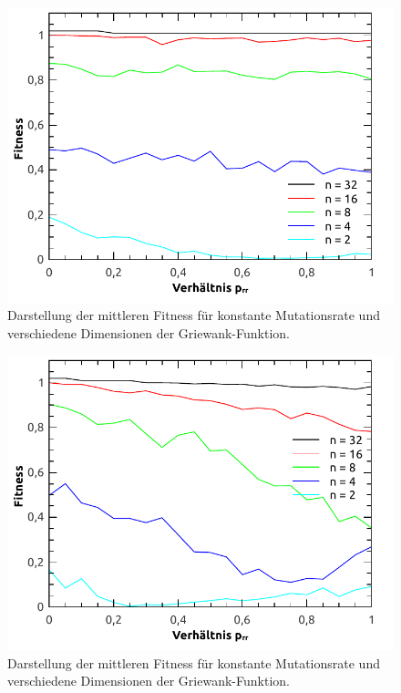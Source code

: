 \documentclass[12pt,
    a4paper,
    headinclude,
    footinclude]{scrartcl}
\begin{document}
	\begin{figure}[!h]
		\begin{center}
			\includegraphics[width=\size\textwidth]{../vortrag/abbildungen/constant_allDim_average.pdf}
			\caption{Darstellung der mittleren Fitness für konstante Mutationsrate und verschiedene Dimensionen der Griewank-Funktion.}
		\end{center}
	\end{figure}

	\begin{figure}[!h]
		\begin{center}
			\includegraphics[width=\size\textwidth]{../vortrag/abbildungen/increasing_allDim_average.pdf}
			\caption{Darstellung der mittleren Fitness für konstante Mutationsrate und verschiedene Dimensionen der Griewank-Funktion.}
		\end{center}
	\end{figure}
		
\end{document}
